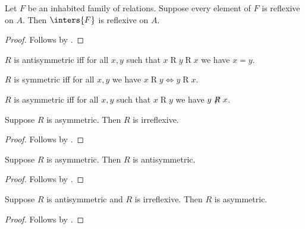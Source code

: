 \begin{proposition}\label{inters_of_family_of_reflexive_relations_is_reflexive}
    Let $F$ be an inhabited family of relations.
    Suppose every element of $F$ is reflexive on $A$.
    Then $\inters{F}$ is reflexive on $A$.
\end{proposition}
\begin{proof}
    Follows by .
\end{proof}

\begin{definition}\label{antisymmetric}
    $R$ is antisymmetric iff
    for all $x, y$ such that $x\mathrel{R}y\mathrel{R}x$
    we have $x = y$.
\end{definition}

\begin{definition}[Symmetry]\label{symmetric}
    $R$ is symmetric iff
    for all $x, y$ we have
    $x\mathrel{R} y \iff y\mathrel{R}x$.
\end{definition}

\begin{definition}\label{asymmetric}
    $R$ is asymmetric iff
    for all $x, y$ such that
    $x\mathrel{R} y$ we have $y\not\mathrel{R}x$.
\end{definition}

\begin{proposition}\label{asymmetric_implies_irreflexive}
    Suppose $R$ is asymmetric.
    Then $R$ is irreflexive.
\end{proposition}
\begin{proof}
    Follows by .
\end{proof}

\begin{proposition}\label{asymmetric_implies_antisymmetric}
    Suppose $R$ is asymmetric.
    Then $R$ is antisymmetric.
\end{proposition}
\begin{proof}
    Follows by .
\end{proof}

\begin{proposition}\label{antisymmetric_and_irreflexive_implies_asymmetric}
    Suppose $R$ is antisymmetric and $R$ is irreflexive.
    Then $R$ is asymmetric.
\end{proposition}
\begin{proof}
    Follows by .
\end{proof}

